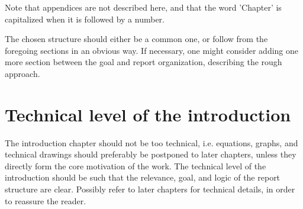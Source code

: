Note that appendices are not described here, and that the word 'Chapter' is capitalized when it is followed by a number.

The chosen structure should either be a common one, or follow from the foregoing sections in an obvious way. If necessary, one might consider adding one more section between the goal and report organization, describing the rough approach.


\section{Technical level of the introduction}

The introduction chapter should not be too technical, i.e. equations, graphs, and technical drawings should preferably be postponed to later chapters, unless they directly form the core motivation of the work. The technical level of the introduction should be such that the relevance, goal, and logic of the report structure are clear. Possibly refer to later chapters for technical details, in order to reassure the reader.
